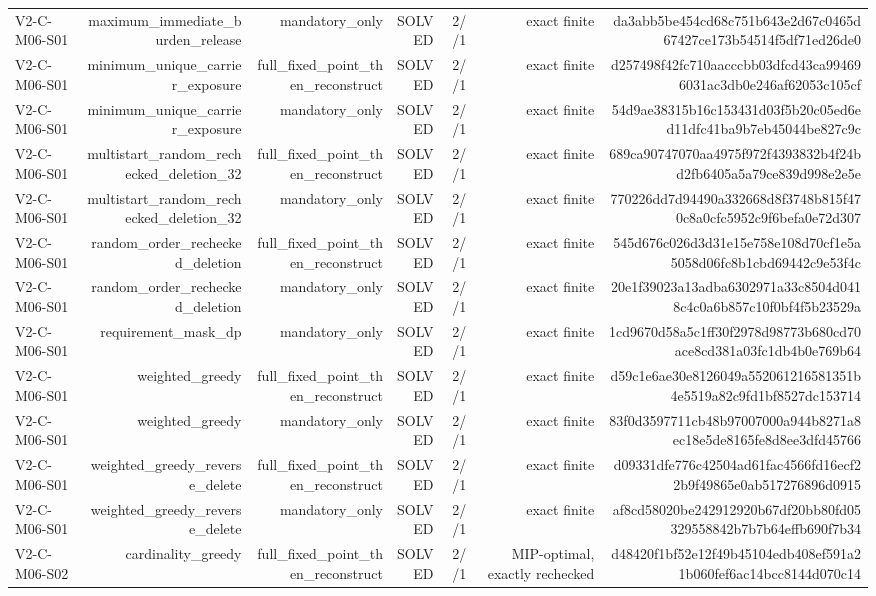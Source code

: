 {\begin{longtable}{lrrrrrr}
V2-C-M06-S01 & maximum\_immediate\_burden\_release & mandatory\_only & SOLVED & 2//1 & exact finite & da3abb5be454cd68c751b643e2d67c0465d67427ce173b54514f5df71ed26de0 \\
V2-C-M06-S01 & minimum\_unique\_carrier\_exposure & full\_fixed\_point\_then\_reconstruct & SOLVED & 2//1 & exact finite & d257498f42fc710aacccbb03dfcd43ca994696031ac3db0e246af62053c105cf \\
V2-C-M06-S01 & minimum\_unique\_carrier\_exposure & mandatory\_only & SOLVED & 2//1 & exact finite & 54d9ae38315b16c153431d03f5b20c05ed6ed11dfc41ba9b7eb45044be827c9c \\
V2-C-M06-S01 & multistart\_random\_rechecked\_deletion\_32 & full\_fixed\_point\_then\_reconstruct & SOLVED & 2//1 & exact finite & 689ca90747070aa4975f972f4393832b4f24bd2fb6405a5a79ce839d998e2e5e \\
V2-C-M06-S01 & multistart\_random\_rechecked\_deletion\_32 & mandatory\_only & SOLVED & 2//1 & exact finite & 770226dd7d94490a332668d8f3748b815f470c8a0cfc5952c9f6befa0e72d307 \\
V2-C-M06-S01 & random\_order\_rechecked\_deletion & full\_fixed\_point\_then\_reconstruct & SOLVED & 2//1 & exact finite & 545d676c026d3d31e15e758e108d70cf1e5a5058d06fc8b1cbd69442c9e53f4c \\
V2-C-M06-S01 & random\_order\_rechecked\_deletion & mandatory\_only & SOLVED & 2//1 & exact finite & 20e1f39023a13adba6302971a33c8504d0418c4c0a6b857c10f0bf4f5b23529a \\
V2-C-M06-S01 & requirement\_mask\_dp & mandatory\_only & SOLVED & 2//1 & exact finite & 1cd9670d58a5c1ff30f2978d98773b680cd70ace8cd381a03fc1db4b0e769b64 \\
V2-C-M06-S01 & weighted\_greedy & full\_fixed\_point\_then\_reconstruct & SOLVED & 2//1 & exact finite & d59c1e6ae30e8126049a552061216581351b4e5519a82c9fd1bf8527dc153714 \\
V2-C-M06-S01 & weighted\_greedy & mandatory\_only & SOLVED & 2//1 & exact finite & 83f0d3597711cb48b97007000a944b8271a8ec18e5de8165fe8d8ee3dfd45766 \\
V2-C-M06-S01 & weighted\_greedy\_reverse\_delete & full\_fixed\_point\_then\_reconstruct & SOLVED & 2//1 & exact finite & d09331dfe776c42504ad61fac4566fd16ecf22b9f49865e0ab517276896d0915 \\
V2-C-M06-S01 & weighted\_greedy\_reverse\_delete & mandatory\_only & SOLVED & 2//1 & exact finite & af8cd58020be242912920b67df20bb80fd05329558842b7b7b64effb690f7b34 \\
V2-C-M06-S02 & cardinality\_greedy & full\_fixed\_point\_then\_reconstruct & SOLVED & 2//1 & MIP-optimal, exactly rechecked & d48420f1bf52e12f49b45104edb408ef591a21b060fef6ac14bcc8144d070c14 \\

\end{longtable}}
